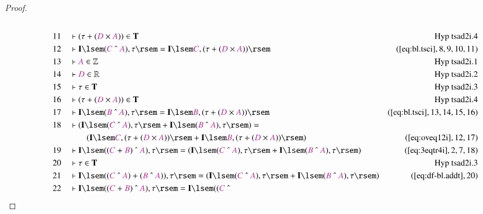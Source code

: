 \begin{proof}
\begin{align}
  \\ 11 &&  & \vdash ( \tau + ( \mc{D} \times \mc{A} ) ) \in
      \mathbf{T}&\text{Hyp~tsad2i.4}\notag%
  \\ 12 &&  & \vdash \mathbf{I} \lsem ( \mc{C} ~\string^~ \mc{A} ) , \tau \rsem
      = \mathbf{I} \lsem \mc{C} , ( \tau + ( \mc{D} \times
      \mc{A} ) )
      \rsem&(\mbox{\ref{eq:bl.tsci}},8,9,10,11)\notag
  \\ 13 &&  & \vdash \mc{A} \in
      \mathbb{Z}&\text{Hyp~tsad2i.1}\notag%
  \\ 14 &&  & \vdash \mc{D} \in
      \mathbb{R}&\text{Hyp~tsad2i.2}\notag%
  \\ 15 &&  & \vdash \tau \in \mathbf{T}&\text{Hyp~tsad2i.3}\notag%
  \\ 16 &&  & \vdash ( \tau + ( \mc{D} \times \mc{A} ) ) \in
      \mathbf{T}&\text{Hyp~tsad2i.4}\notag%
  \\ 17 &&  & \vdash \mathbf{I} \lsem ( \mc{B} ~\string^~ \mc{A} ) , \tau \rsem
      = \mathbf{I} \lsem \mc{B} , ( \tau + ( \mc{D} \times
      \mc{A} ) )
      \rsem&(\mbox{\ref{eq:bl.tsci}},13,14,15,16)\notag
  \\ 18 &&  & \vdash ( \mathbf{I} \lsem ( \mc{C} ~\string^~ \mc{A} ) , \tau
      \rsem + \mathbf{I} \lsem ( \mc{B} ~\string^~ \mc{A} )
      , \tau \rsem ) =  \notag \\ & & & \qquad
     ( \mathbf{I} \lsem \mc{C} , ( \tau +
      ( \mc{D} \times \mc{A} ) ) \rsem + \mathbf{I} \lsem
      \mc{B} , ( \tau + ( \mc{D} \times \mc{A} ) ) \rsem
      )&(\mbox{\ref{eq:oveq12i}},12,17)\notag
  \\ 19 &&  & \vdash \mathbf{I} \lsem ( ( \mc{C} + \mc{B} ) ~\string^~ \mc{A} )
      , \tau \rsem = ( \mathbf{I} \lsem ( \mc{C} ~\string^~
      \mc{A} ) , \tau \rsem + \mathbf{I} \lsem ( \mc{B}
      ~\string^~ \mc{A} ) , \tau \rsem
      )&(\mbox{\ref{eq:3eqtr4i}},2,7,18)\notag
  \\ 20 &&  & \vdash \tau \in \mathbf{T}&\text{Hyp~tsad2i.3}\notag%
  \\ 21 &&  & \vdash \mathbf{I} \lsem ( ( \mc{C} ~\string^~ \mc{A} ) + ( \mc{B}
      ~\string^~ \mc{A} ) ) , \tau \rsem = ( \mathbf{I}
      \lsem ( \mc{C} ~\string^~ \mc{A} ) , \tau \rsem +
      \mathbf{I} \lsem ( \mc{B} ~\string^~ \mc{A} ) , \tau
      \rsem )&(\mbox{\ref{eq:df-bl.addt}},20)\notag
  \\ 22 &&  & \vdash \mathbf{I} \lsem ( ( \mc{C} + \mc{B} ) ~\string^~ \mc{A} )
      , \tau \rsem = \mathbf{I} \lsem ( ( \mc{C} ~\string^~

\end{align}
\end{proof}
